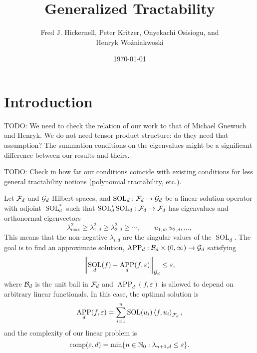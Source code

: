 \documentclass[11pt,a4paper]{article}
\DeclareMathOperator{\SOL}{SOL}
\DeclareMathOperator{\APP}{APP}
\newcommand{\fred}[1]{\begingroup\color{blue}#1\endgroup}
\newcommand{\peter}[1]{\begingroup\color{purple}#1\endgroup}
\newcommand{\kachi}[1]{\begingroup\color{ForestGreen}#1\endgroup}
\begin{document}
\newtheorem{theorem}{Theorem}
\theoremstyle{definition}
\newtheorem{definition}{Definition}


\title{Generalized Tractability}
\author{\fred{Fred J. Hickernell}, \peter{Peter Kritzer}, \kachi{Onyekachi Osisiogu}, and \\ Henryk Wo\'zniakwoski}
\date{\today}

\maketitle

\section{Introduction}

TODO: We need to check the relation of our work to that of Michael Gnewuch and Henryk. We do not need tensor product structure: do they need that assumption? The summation conditions on the eigenvalues might be a significant difference between our results and theirs.

\medskip

TODO: Check in how far our conditions coincide with existing conditions for less general tractability notions (polynomial tractability, etc.).

\medskip

Let $\mathcal{F}_d$ and $\mathcal{G}_d$ Hilbert spaces, and $\SOL_d : \cf_d \to \cg_d$ be a linear solution operator with adjoint $\SOL_d^*$ such that $\SOL_d^*\SOL_d : \cf_d \to \cf_d$ has eigenvalues and orthonormal eigenvectors
\[
\lambda_{\max}^2 \ge \lambda_{1,d}^2 \ge \lambda_{2,d}^2 \ge \cdots, \qquad u_{1,d}, u_{2,d}, \ldots,
\]
This means that the non-negative $\lambda_{i,d}$ are the singular values of the $\SOL_d$. The goal is to find an approximate solution, $\APP_d:\cb_d \times (0,\infty) \to \cg_d$ satisfying
\[
\norm[\cg_d]{\SOL_d(f) - \APP_d(f,\varepsilon)} \le \varepsilon,
\]
where $\mathcal{B}_d$ is the unit ball in $\mathcal{F}_d$ and $\APP_d(f,\varepsilon)$ is allowed to depend on arbitrary linear functionals.  In this case, the optimal solution is
\[
\APP_d(f,\varepsilon) = \sum_{i=1}^n \SOL(u_i) \ip[\cf_d]{f}{u_i},
\]
and the complexity of our linear problem is
\[
\operatorname{comp}(\varepsilon, d) = \min \{n \in \mathbb{N}_{0} : \lambda_{n+1, d} \le \varepsilon\}.
\]
\end{document}
